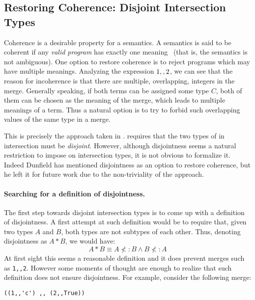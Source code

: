 \subsection{Restoring Coherence: Disjoint Intersection Types}\label{sec:restoring}
Coherence is a desirable property for a semantics. A semantics is said
to be coherent if any \emph{valid program} has exactly one
meaning~\cite{reynolds1991coherence} (that is, the semantics is not ambiguous).
One option to restore coherence is to reject programs which may have
multiple meanings.
Analyzing the expression $1 ,, 2$, we can see that the reason
for incoherence is that there are multiple, overlapping, integers in the
merge. Generally speaking, if both terms can be assigned some type $C$,
both of them can be chosen as the meaning of the merge,
which leads to multiple meanings of a term.
Thus a natural option is to try to forbid such overlapping
values of the same type in a merge.

This is precisely the approach taken in \namedis. \namedis requires that the
two types of in intersection must be \emph{disjoint}.  However,
although disjointness seems a natural restriction to impose on
intersection types, it is not obvious to formalize it. Indeed Dunfield
has mentioned disjointness as an option to restore coherence, but he
left it for future work due to the non-triviality of the approach.

\paragraph{Searching for a definition of disjointness.}
The first step towards disjoint intersection types is to come up
with a definition of disjointness. A first attempt at such definition would
be to require that, given two types $A$ and $B$, both types are not
subtypes of each other. Thus, denoting disjointness as $A * B$, we would have:
\[A * B \equiv A \not<: B \wedge B \not<: A\]
At first sight this seems a reasonable definition and it does prevent
merges such as \lstinline{1,,2}. However some moments of thought are enough to realize that
such definition does not ensure disjointness. For example, consider
the following merge:

\begin{lstlisting}
((1,,'c') ,, (2,,True))
\end{lstlisting}

